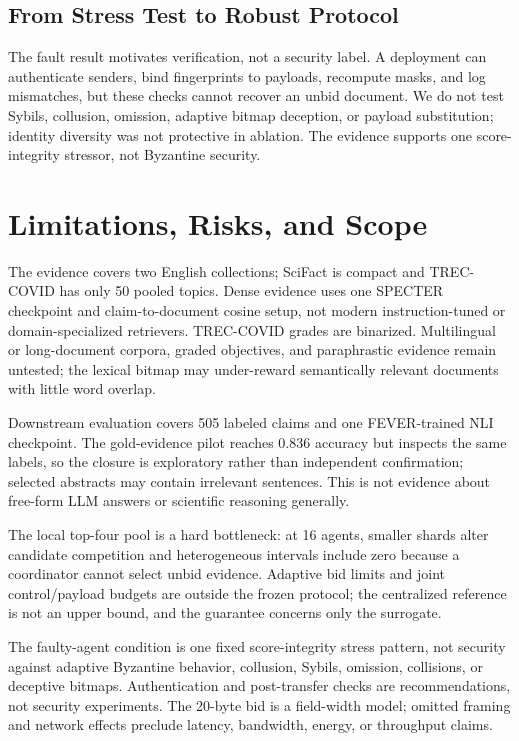 \documentclass[sigconf]{acmart}
\begin{document}
\subsection{From Stress Test to Robust Protocol}

The fault result motivates verification, not a security label. A deployment can authenticate senders, bind fingerprints to payloads, recompute masks, and log mismatches, but these checks cannot recover an unbid document. We do not test Sybils, collusion, omission, adaptive bitmap deception, or payload substitution; identity diversity was not protective in ablation. The evidence supports one score-integrity stressor, not Byzantine security.

\section{Limitations, Risks, and Scope}

The evidence covers two English collections; SciFact is compact and TREC-COVID has only 50 pooled topics. Dense evidence uses one SPECTER checkpoint and claim-to-document cosine setup, not modern instruction-tuned or domain-specialized retrievers. TREC-COVID grades are binarized. Multilingual or long-document corpora, graded objectives, and paraphrastic evidence remain untested; the lexical bitmap may under-reward semantically relevant documents with little word overlap.

Downstream evaluation covers 505 labeled claims and one FEVER-trained NLI checkpoint. The gold-evidence pilot reaches 0.836 accuracy but inspects the same labels, so the closure is exploratory rather than independent confirmation; selected abstracts may contain irrelevant sentences. This is not evidence about free-form LLM answers or scientific reasoning generally.

The local top-four pool is a hard bottleneck: at 16 agents, smaller shards alter candidate competition and heterogeneous intervals include zero because a coordinator cannot select unbid evidence. Adaptive bid limits and joint control/payload budgets are outside the frozen protocol; the centralized reference is not an upper bound, and the guarantee concerns only the surrogate.

The faulty-agent condition is one fixed score-integrity stress pattern, not security against adaptive Byzantine behavior, collusion, Sybils, omission, collisions, or deceptive bitmaps. Authentication and post-transfer checks are recommendations, not security experiments. The 20-byte bid is a field-width model; omitted framing and network effects preclude latency, bandwidth, energy, or throughput claims.
\end{document}
